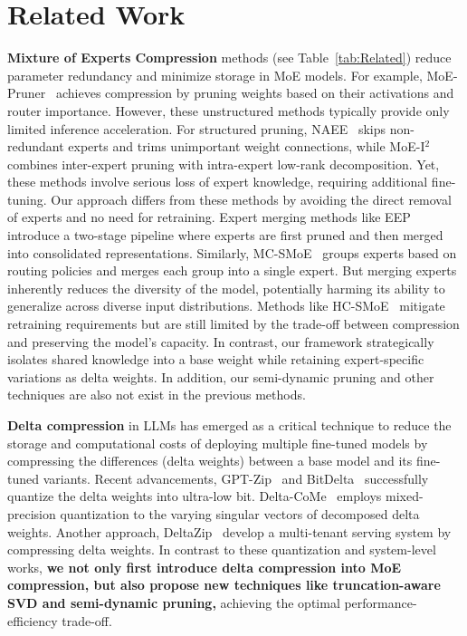 \section{Related Work}
\label{sec:related_works}

\textbf{Mixture of Experts Compression} methods (see Table~\ref{tab:Related}) reduce parameter redundancy and minimize storage in MoE models. For example,  MoE-Pruner~\cite{xie2024moe} achieves compression by pruning weights based on their activations and router importance. However, these unstructured methods typically provide only limited inference acceleration. For structured pruning, NAEE~\cite{lu2024experts} skips non-redundant experts and trims unimportant weight connections, while MoE-I$^2$\citep{yang2024moe} combines inter-expert pruning with intra-expert low-rank decomposition. Yet, these methods involve serious loss of expert knowledge, requiring additional fine-tuning. Our approach differs from these methods by avoiding the direct removal of experts and no need for retraining. Expert merging methods like EEP~\cite{liu2024efficient} introduce a two-stage pipeline where experts are first pruned and then merged into consolidated representations. Similarly, MC-SMoE~\cite{li2023merge} groups experts based on routing policies and merges each group into a single expert. But  merging experts inherently reduces the diversity of the model, potentially harming its ability to generalize across diverse input distributions. Methods like HC-SMoE~\cite{chen2024retraining} mitigate retraining requirements but are still limited by the trade-off between compression and preserving the model's capacity. In contrast, our framework strategically isolates shared knowledge into a base weight while retaining expert-specific variations as delta weights.  In addition, our semi-dynamic pruning and other techniques are also not exist in the previous methods.


\textbf{Delta compression} in LLMs has emerged as a critical technique to reduce the storage and computational costs of deploying multiple fine-tuned models by compressing the differences (delta weights) between a base model and its fine-tuned variants. Recent advancements, GPT-Zip~\cite{isik2023gptzip} and BitDelta~\citet{liu2024bitdelta}  successfully quantize the delta weights into ultra-low bit. Delta-CoMe~\citep{ping2024deltacome} employs mixed-precision quantization to the varying singular vectors of decomposed delta weights. Another approach, DeltaZip~\cite{yao2023deltazip} develop a multi-tenant serving system by compressing delta weights. In contrast to these quantization and system-level works, \textbf{we not only first introduce delta compression into MoE compression, but also propose new techniques like truncation-aware SVD and semi-dynamic pruning,} achieving the optimal performance-efficiency trade-off.






